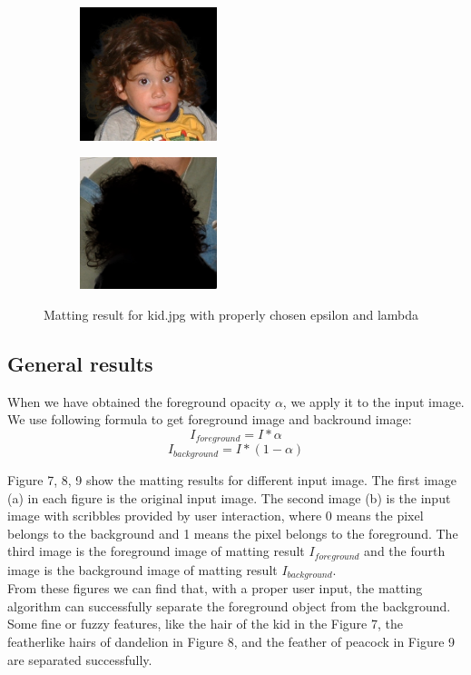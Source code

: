 \documentclass[11pt,letterpaper]{article}
\begin{document}
\begin{figure}[h!]
  \centering
  \begin{subfigure}{0.24\textwidth}
    \centering
    \includegraphics[width=4cm]{./result/kid/kid_foreground.jpg}
    \caption{}
  \end{subfigure}
  \begin{subfigure}{0.24\textwidth}
    \centering
    \includegraphics[width=4cm]{./result/kid/kid_background.jpg}
    \caption{}
  \end{subfigure}   
  \caption {Matting result for kid.jpg with properly chosen epsilon and lambda}
\end{figure}

\clearpage

\subsection{General results}
When we have obtained the foreground opacity $\alpha$, we apply it to the input image. We use following formula to get foreground image and backround image:
$$I_{foreground} = I * \alpha$$
$$I_{background} = I * (1-\alpha)$$

Figure 7, 8, 9 show the matting results for different input image. The first image (a) in each figure is the original input image. The second image (b) is the input image with scribbles provided by user interaction, where 0 means the pixel belongs to the background and 1 means the pixel belongs to the foreground. The third image is the foreground image of matting result $I_{foreground}$ and the fourth image is the background image of matting result $I_{background}$.\\

From these figures we can find that, with a proper user input, the matting algorithm can successfully separate the foreground object from the background. Some fine or fuzzy features, like the hair of the kid in the Figure 7, the featherlike hairs of dandelion in Figure 8, and the feather of peacock in Figure 9 are separated successfully. \\
\end{document}
